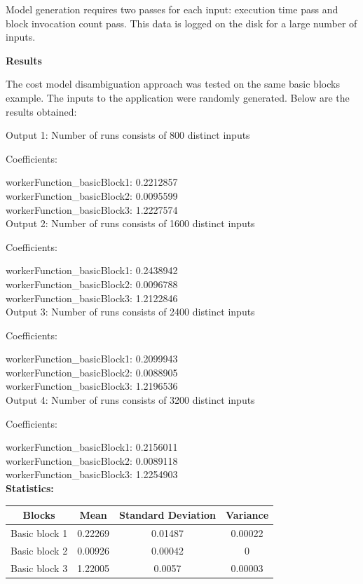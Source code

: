 \documentclass[11pt]{article}
\begin{document}
Model generation requires two passes for each input: execution time pass and block invocation count pass. This data is logged on the disk for a large number of inputs.\newline 

\textbf{Results}

The cost model disambiguation approach was tested on the same basic blocks example. The inputs to the application were randomly generated. Below are the results obtained:

Output 1: Number of runs consists of 800 distinct inputs

Coefficients:

workerFunction\_basicBlock1: 0.2212857\\
workerFunction\_basicBlock2: 0.0095599\\
workerFunction\_basicBlock3: 1.2227574\\

Output 2: Number of runs consists of 1600 distinct inputs

Coefficients:

workerFunction\_basicBlock1: 0.2438942\\
workerFunction\_basicBlock2: 0.0096788\\
workerFunction\_basicBlock3: 1.2122846\\


Output 3: Number of runs consists of 2400 distinct inputs

Coefficients:

workerFunction\_basicBlock1: 0.2099943\\
workerFunction\_basicBlock2: 0.0088905\\
workerFunction\_basicBlock3: 1.2196536\\

Output 4: Number of runs consists of 3200 distinct inputs

Coefficients:

workerFunction\_basicBlock1: 0.2156011\\
workerFunction\_basicBlock2: 0.0089118\\
workerFunction\_basicBlock3: 1.2254903\\


\textbf{Statistics: }

\begin{center}
\begin{tabular}{|c|c|c|c|}
\hline
Blocks&Mean&Standard Deviation&Variance\\
\hline
Basic block 1&0.22269&0.01487&0.00022\\
Basic block 2&0.00926&0.00042&0\\
Basic block 3&1.22005&0.0057&0.00003\\
\hline
\end{tabular}
\end{center}
\end{document}
